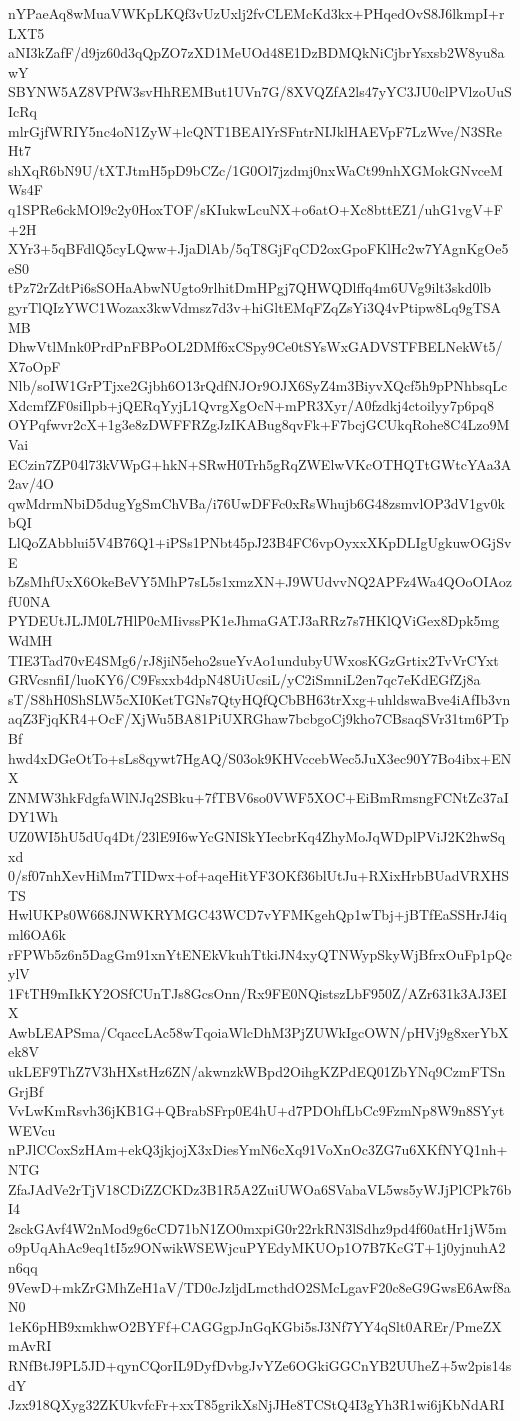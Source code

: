 nYPaeAq8wMuaVWKpLKQf3vUzUxlj2fvCLEMcKd3kx+PHqedOvS8J6lkmpI+rLXT5
aNI3kZafF/d9jz60d3qQpZO7zXD1MeUOd48E1DzBDMQkNiCjbrYsxsb2W8yu8awY
SBYNW5AZ8VPfW3svHhREMBut1UVn7G/8XVQZfA2ls47yYC3JU0clPVlzoUuSIcRq
mlrGjfWRIY5nc4oN1ZyW+lcQNT1BEAlYrSFntrNIJklHAEVpF7LzWve/N3SReHt7
shXqR6bN9U/tXTJtmH5pD9bCZc/1G0Ol7jzdmj0nxWaCt99nhXGMokGNvceMWs4F
q1SPRe6ckMOl9c2y0HoxTOF/sKIukwLcuNX+o6atO+Xc8bttEZ1/uhG1vgV+F+2H
XYr3+5qBFdlQ5cyLQww+JjaDlAb/5qT8GjFqCD2oxGpoFKlHc2w7YAgnKgOe5eS0
tPz72rZdtPi6sSOHaAbwNUgto9rlhitDmHPgj7QHWQDlffq4m6UVg9ilt3skd0lb
gyrTlQIzYWC1Wozax3kwVdmsz7d3v+hiGltEMqFZqZsYi3Q4vPtipw8Lq9gTSAMB
DhwVtlMnk0PrdPnFBPoOL2DMf6xCSpy9Ce0tSYsWxGADVSTFBELNekWt5/X7oOpF
Nlb/soIW1GrPTjxe2Gjbh6O13rQdfNJOr9OJX6SyZ4m3BiyvXQcf5h9pPNhbsqLc
XdcmfZF0siIlpb+jQERqYyjL1QvrgXgOcN+mPR3Xyr/A0fzdkj4ctoilyy7p6pq8
OYPqfwvr2cX+1g3e8zDWFFRZgJzIKABug8qvFk+F7bcjGCUkqRohe8C4Lzo9MVai
ECzin7ZP04l73kVWpG+hkN+SRwH0Trh5gRqZWElwVKcOTHQTtGWtcYAa3A2av/4O
qwMdrmNbiD5dugYgSmChVBa/i76UwDFFc0xRsWhujb6G48zsmvlOP3dV1gv0kbQI
LlQoZAbblui5V4B76Q1+iPSs1PNbt45pJ23B4FC6vpOyxxXKpDLIgUgkuwOGjSvE
bZsMhfUxX6OkeBeVY5MhP7sL5s1xmzXN+J9WUdvvNQ2APFz4Wa4QOoOIAozfU0NA
PYDEUtJLJM0L7HlP0cMIivssPK1eJhmaGATJ3aRRz7s7HKlQViGex8Dpk5mgWdMH
TIE3Tad70vE4SMg6/rJ8jiN5eho2sueYvAo1undubyUWxosKGzGrtix2TvVrCYxt
GRVcsnfiI/luoKY6/C9Fsxxb4dpN48UiUcsiL/yC2iSmniL2en7qc7eKdEGfZj8a
sT/S8hH0ShSLW5cXI0KetTGNs7QtyHQfQCbBH63trXxg+uhldswaBve4iAfIb3vn
aqZ3FjqKR4+OcF/XjWu5BA81PiUXRGhaw7bcbgoCj9kho7CBsaqSVr31tm6PTpBf
hwd4xDGeOtTo+sLs8qywt7HgAQ/S03ok9KHVccebWec5JuX3ec90Y7Bo4ibx+ENX
ZNMW3hkFdgfaWlNJq2SBku+7fTBV6so0VWF5XOC+EiBmRmsngFCNtZc37aIDY1Wh
UZ0WI5hU5dUq4Dt/23lE9I6wYcGNISkYIecbrKq4ZhyMoJqWDplPViJ2K2hwSqxd
0/sf07nhXevHiMm7TIDwx+of+aqeHitYF3OKf36blUtJu+RXixHrbBUadVRXHSTS
HwlUKPs0W668JNWKRYMGC43WCD7vYFMKgehQp1wTbj+jBTfEaSSHrJ4iqml6OA6k
rFPWb5z6n5DagGm91xnYtENEkVkuhTtkiJN4xyQTNWypSkyWjBfrxOuFp1pQcylV
1FtTH9mIkKY2OSfCUnTJs8GcsOnn/Rx9FE0NQistszLbF950Z/AZr631k3AJ3EIX
AwbLEAPSma/CqaccLAc58wTqoiaWlcDhM3PjZUWkIgcOWN/pHVj9g8xerYbXek8V
ukLEF9ThZ7V3hHXstHz6ZN/akwnzkWBpd2OihgKZPdEQ01ZbYNq9CzmFTSnGrjBf
VvLwKmRsvh36jKB1G+QBrabSFrp0E4hU+d7PDOhfLbCc9FzmNp8W9n8SYytWEVcu
nPJlCCoxSzHAm+ekQ3jkjojX3xDiesYmN6cXq91VoXnOc3ZG7u6XKfNYQ1nh+NTG
ZfaJAdVe2rTjV18CDiZZCKDz3B1R5A2ZuiUWOa6SVabaVL5ws5yWJjPlCPk76bI4
2sckGAvf4W2nMod9g6cCD71bN1ZO0mxpiG0r22rkRN3lSdhz9pd4f60atHr1jW5m
o9pUqAhAc9eq1tI5z9ONwikWSEWjcuPYEdyMKUOp1O7B7KcGT+1j0yjnuhA2n6qq
9VewD+mkZrGMhZeH1aV/TD0cJzljdLmcthdO2SMcLgavF20c8eG9GwsE6Awf8aN0
1eK6pHB9xmkhwO2BYFf+CAGGgpJnGqKGbi5sJ3Nf7YY4qSlt0AREr/PmeZXmAvRI
RNfBtJ9PL5JD+qynCQorIL9DyfDvbgJvYZe6OGkiGGCnYB2UUheZ+5w2pis14sdY
Jzx918QXyg32ZKUkvfcFr+xxT85grikXsNjJHe8TCStQ4I3gYh3R1wi6jKbNdARI
